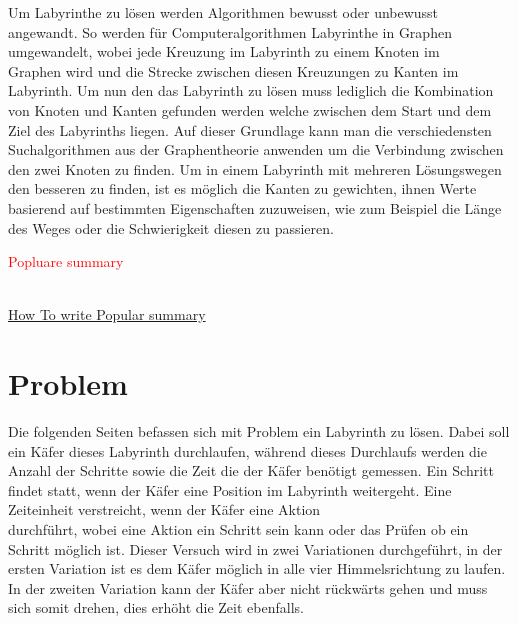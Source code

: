 \documentclass[11pt, a4paper]{article}
\newif\ifproofread
\newcommand{\changemarker}[1]{%
\ifproofread
\textcolor{red}{#1}%
\else
#1%
\fi
}
\begin{document}
\bigskip

Um Labyrinthe zu lösen werden Algorithmen bewusst oder unbewusst angewandt. So werden für Computeralgorithmen Labyrinthe in Graphen umgewandelt, wobei jede Kreuzung im Labyrinth zu einem Knoten im \\ Graphen wird und die Strecke zwischen diesen Kreuzungen zu Kanten im Labyrinth. Um nun den das Labyrinth zu lösen muss lediglich die Kombination von Knoten und Kanten gefunden werden welche zwischen dem Start und dem Ziel des Labyrinths liegen. Auf dieser Grundlage kann man die verschiedensten Suchalgorithmen aus der Graphentheorie anwenden um die Verbindung zwischen den zwei Knoten zu finden. Um in einem Labyrinth mit mehreren Lösungswegen den besseren zu finden, ist es möglich die Kanten zu gewichten, ihnen Werte basierend auf bestimmten Eigenschaften zuzuweisen, wie zum Beispiel die Länge des Weges oder die Schwierigkeit diesen zu passieren.

\bigskip

\proofreadtrue

\changemarker{Popluare summary} \\
\href{https://www.jus.uio.no/english/research/phd/thesis-evaluation/evaluation/popular-science-summary.html}{How To write Popular summary}
\proofreadfalse

\newpage

\section{Problem}

Die folgenden Seiten befassen sich mit Problem ein Labyrinth zu lösen. Dabei soll ein Käfer dieses Labyrinth durchlaufen, während dieses Durchlaufs werden die Anzahl der Schritte sowie die Zeit die der Käfer benötigt gemessen. Ein Schritt findet statt, wenn der Käfer eine Position im Labyrinth weitergeht. Eine Zeiteinheit verstreicht, wenn der Käfer eine Aktion \\ durchführt, wobei eine Aktion ein Schritt sein kann oder das Prüfen ob ein Schritt möglich ist. Dieser Versuch wird in zwei Variationen durchgeführt, in der ersten Variation ist es dem Käfer möglich in alle vier Himmelsrichtung zu laufen. In der zweiten Variation kann der Käfer aber nicht rückwärts gehen und muss sich somit drehen, dies erhöht die Zeit ebenfalls.

\bigskip
\end{document}
